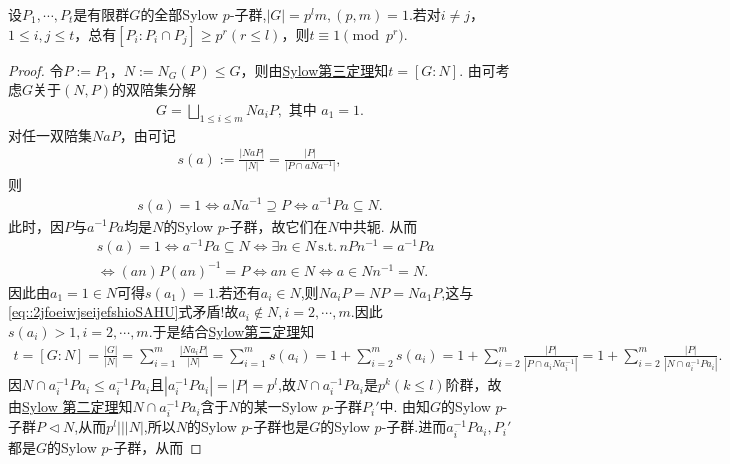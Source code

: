 \documentclass[../../main.tex]{subfiles}%
\begin{document}
\begin{example}
设$P_1,\cdots,P_t$是有限群$G$的全部Sylow $p$-子群,$|G|=p^lm,(p,m)=1$.若对$i\neq j$，$1\leqslant i,j\leqslant t$，总有$[P_i:P_i\cap P_j]\geqslant p^r(r\leqslant l)$，则$t\equiv 1\pmod{p^r}$.
\end{example}
\begin{proof}

令$P:=P_1$，$N:=N_G(P)\leqslant G$，则由\hyperref[theorem:Sylow第三定理]{Sylow第三定理}知$t=[G:N]$. 由可考虑$G$关于$(N,P)$的双陪集分解
\begin{align}\label{eq::2jfoeiwjseijefshioSAHU}
G=\bigsqcup_{1\leqslant i\leqslant m} Na_iP, \text{ 其中 } a_1=1.
\end{align}
对任一双陪集$NaP$，由可记
\begin{align*}
s(a):=\frac{|NaP|}{|N|}=\frac{|P|}{|P\cap aNa^{-1}|},
\end{align*}
则
\begin{align*}
s(a)=1\iff aNa^{-1}\supseteq P\iff a^{-1}Pa\subseteq N.
\end{align*}
此时，因$P$与$a^{-1}Pa$均是$N$的Sylow $p$-子群，故它们在$N$中共轭. 从而
\begin{align*}
&s(a)=1\iff a^{-1}Pa\subseteq N\iff \exists n\in N\,\text{s.t.}\,nPn^{-1}=a^{-1}Pa
\\
&\iff (an)P(an)^{-1}=P\iff an\in N\iff a\in Nn^{-1}= N.
\end{align*}
因此由$a_1=1\in N$可得$s(a_1)=1$.若还有$a_i\in N$,则$Na_iP=NP=Na_1P$,这与\eqref{eq::2jfoeiwjseijefshioSAHU}式矛盾!故$a_i\notin N,i=2,\cdots,m$.因此$s(a_i)>1,i=2,\cdots,m$.于是结合\hyperref[theorem:Sylow第三定理]{Sylow第三定理}知
\begin{align}
t=[G:N]=\frac{\left| G \right|}{\left| N \right|}=\sum_{i=1}^m{\frac{|Na_iP|}{\left| N \right|}}=\sum_{i=1}^m{s\left( a_i \right)}=1+\sum_{i=2}^m{s\left( a_i \right)}=1+\sum_{i=2}^m{\frac{\left| P \right|}{\left| P\cap a_iNa_{i}^{-1} \right|}}=1+\sum_{i=2}^m{\frac{\left| P \right|}{\left| N\cap a_{i}^{-1}Pa_i \right|}}.\label{eq::FJIOJW329r}
\end{align}
因$N\cap a_i^{-1}Pa_i\leqslant a_i^{-1}Pa_i$且$|a_i^{-1}Pa_i|=|P|=p^l$,故$N\cap a_i^{-1}Pa_i$是$p^k(k\leqslant l)$阶群，故由\hyperref[theorem:Sylow 第二定理]{Sylow 第二定理}知$N\cap a_i^{-1}Pa_i$含于$N$的某一Sylow $p$-子群$P_i'$中. 由知$G$的Sylow $p$-子群$P\lhd N$,从而$p^l|||N|$,所以$N$的Sylow $p$-子群也是$G$的Sylow $p$-子群.进而$a_i^{-1}Pa_i,P_i'$都是$G$的Sylow $p$-子群，从而

\end{proof}
\end{document}
